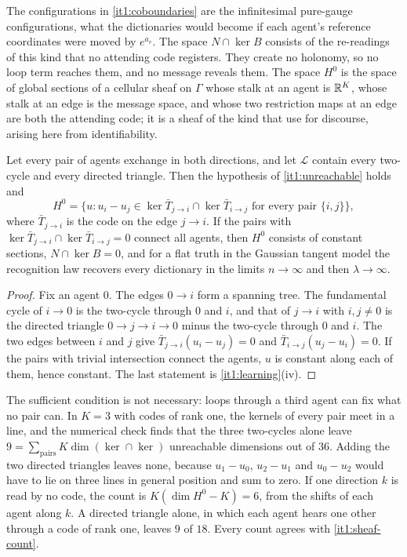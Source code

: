 \documentclass[11pt,letterpaper]{report}
\begin{document}
The configurations in \cref{it1:coboundaries} are the infinitesimal pure-gauge configurations, what the dictionaries would become if each agent's reference coordinates were moved by $e^{a_v}$. The space $N\cap\ker B$ consists of the re-readings of this kind that no attending code registers. They create no holonomy, so no loop term reaches them, and no message reveals them. The space $H^0$ is the space of global sections of a cellular sheaf on $\Gamma$ whose stalk at an agent is $\mathbb R^K$, whose stalk at an edge is the message space, and whose two restriction maps at an edge are both the attending code; it is a sheaf of the kind that \citet{HansenGhrist2021} use for discourse, arising here from identifiability.

Let every pair of agents exchange in both directions, and let $\mathcal L$ contain every two-cycle and every directed triangle. Then the hypothesis of \cref{it1:unreachable} holds and
\begin{equation}
H^0=\bigl\{u:u_i-u_j\in\ker\bar T_{j\to i}\cap\ker\bar T_{i\to j}\text{ for every pair }\{i,j\}\bigr\},
\end{equation}
where $\bar T_{j\to i}$ is the code on the edge $j\to i$. If the pairs with $\ker\bar T_{j\to i}\cap\ker\bar T_{i\to j}=0$ connect all agents, then $H^0$ consists of constant sections, $N\cap\ker B=0$, and for a flat truth in the Gaussian tangent model the recognition law recovers every dictionary in the limits $n\to\infty$ and then $\lambda\to\infty$.
\begin{proof}
Fix an agent $0$. The edges $0\to i$ form a spanning tree. The fundamental cycle of $i\to0$ is the two-cycle through $0$ and $i$, and that of $j\to i$ with $i,j\neq0$ is the directed triangle $0\to j\to i\to0$ minus the two-cycle through $0$ and $i$. The two edges between $i$ and $j$ give $\bar T_{j\to i}(u_i-u_j)=0$ and $\bar T_{i\to j}(u_j-u_i)=0$. If the pairs with trivial intersection connect the agents, $u$ is constant along each of them, hence constant. The last statement is \cref{it1:learning}(iv).
\end{proof}

The sufficient condition is not necessary: loops through a third agent can fix what no pair can. In $K=3$ with codes of rank one, the kernels of every pair meet in a line, and the numerical check finds that the three two-cycles alone leave $9=\sum_{\text{pairs}}K\dim(\ker\cap\ker)$ unreachable dimensions out of $36$. Adding the two directed triangles leaves none, because $u_1-u_0$, $u_2-u_1$ and $u_0-u_2$ would have to lie on three lines in general position and sum to zero. If one direction $k$ is read by no code, the count is $K(\dim H^0-K)=6$, from the shifts of each agent along $k$. A directed triangle alone, in which each agent hears one other through a code of rank one, leaves $9$ of $18$. Every count agrees with \cref{it1:sheaf-count}.
\end{document}
